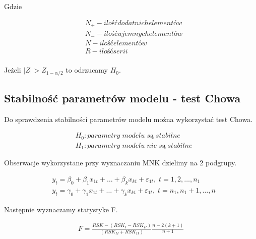 Gdzie

\begin{equation}
    \begin{split}
        &N_+ - ilość dodatnich elementów \\
        &N_- - ilość ujemnych elementów \\
        &N - ilość elementów \\
        &R - ilość serii \\
    \end{split}
\end{equation}


Jeżeli \(|Z| > Z_{1-\alpha/2}\) to odrzucamy \(H_0\).

\subsection{Stabilność parametrów modelu - test Chowa}\label{subsec:stabilność-parametrów-modelu}

Do sprawdzenia stabilności parametrów modelu można wykorzystać test Chowa.

\begin{equation}
    \begin{split}
        &H_0: parametry \;  modelu \; są \; stabilne \\
        &H_1: parametry \;  modelu \; nie \; są \; stabilne
    \end{split}
\end{equation}

Obserwacje wykorzystane przy wyznaczaniu MNK dzielimy na 2 podgrupy.

\begin{equation}
    \begin{split}
        &y_t = \beta_0 + \beta_{1}x_{1t} + \dots + \beta_{k}x_{kt} + \varepsilon_{1t}, \;  t= 1,2, \dots , n_1  \\
        &y_t = \gamma_0 + \gamma_{1}x_{1t} + \dots + \gamma_{k}x_{kt} + \varepsilon_{1t}, \;  t= n_1,n_1 +1, \dots , n
    \end{split}
\end{equation}

Następnie wyznaczamy statystyke F.

\begin{equation}
    \begin{split}
        F = \frac{RSK - (RSK_I - RSK_{II})}{(RSK_{II}  + RSK_{II})} \frac{n-2(k+1)}{n+1}
    \end{split}
\end{equation}


